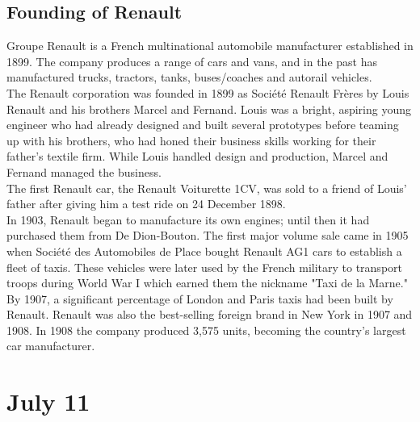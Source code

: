 \documentclass[11pt]{report}
\begin{document}
\subsection{Founding of Renault}
Groupe Renault is a French multinational automobile manufacturer established in 1899. The company produces a range of cars and vans, and in the past has manufactured trucks, tractors, tanks, buses/coaches and autorail vehicles.\\ \indent The Renault corporation was founded in 1899 as Société Renault Frères by Louis Renault and his brothers Marcel and Fernand. Louis was a bright, aspiring young engineer who had already designed and built several prototypes before teaming up with his brothers, who had honed their business skills working for their father's textile firm. While Louis handled design and production, Marcel and Fernand managed the business.\\
\indent The first Renault car, the Renault Voiturette 1CV, was sold to a friend of Louis' father after giving him a test ride on 24 December 1898.\\ \indent In 1903, Renault began to manufacture its own engines; until then it had purchased them from De Dion-Bouton. The first major volume sale came in 1905 when Société des Automobiles de Place bought Renault AG1 cars to establish a fleet of taxis. These vehicles were later used by the French military to transport troops during World War I which earned them the nickname "Taxi de la Marne." By 1907, a significant percentage of London and Paris taxis had been built by Renault. Renault was also the best-selling foreign brand in New York in 1907 and 1908. In 1908 the company produced 3,575 units, becoming the country's largest car manufacturer.
\section{July 11}
\end{document}
